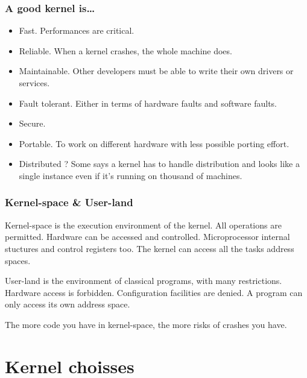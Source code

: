 
\begin{frame}
  \frametitle{A good kernel is\ldots}

  \begin{itemize}
  \item
    Fast. Performances are critical.
  \item
    Reliable. When a kernel crashes, the whole machine does.
  \item
    Maintainable. Other developers must be able to write their own
    drivers or services.
  \item
    Fault tolerant. Either in terms of hardware faults and software
    faults.
  \item
    Secure.
  \item
    Portable. To work on different hardware with less possible porting
    effort.
  \item
    Distributed ? Some says a kernel has to handle distribution and looks
    like a single instance even if it's running on thousand of machines.
  \end{itemize}

\end{frame}


\begin{frame}
  \frametitle{Kernel-space \& User-land}

  Kernel-space is the execution environment of the kernel. All
  operations are permitted. Hardware can be accessed and
  controlled. Microprocessor internal stuctures and control registers
  too. The kernel can access all the tasks address spaces.

  \-

  User-land is the environment of classical programs, with many
  restrictions. Hardware access is forbidden. Configuration facilities
  are denied. A program can only access its own address space.

  \-

  The more code you have in kernel-space, the more risks of crashes you
  have.

\end{frame}

%
%

\section{Kernel choisses}

